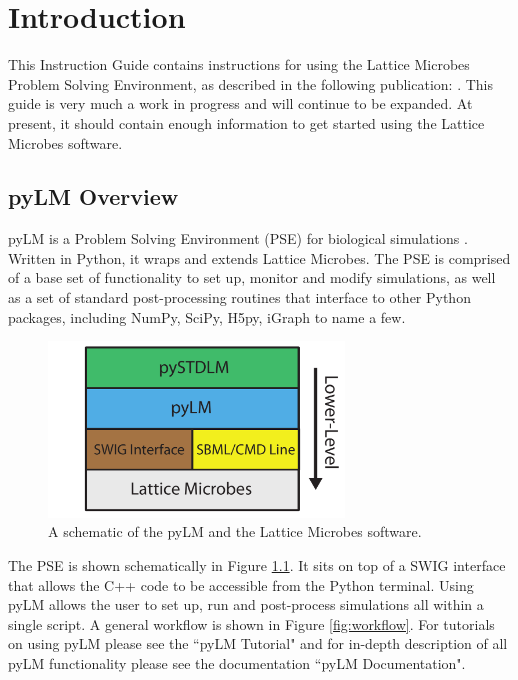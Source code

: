 \chapter{Introduction}

This Instruction Guide contains instructions for using the Lattice Microbes Problem Solving Environment, as described in the following
publication: \cite{Peterson2013}. This guide is very much a work in progress and will continue to be expanded. At present, it should contain enough information to get started using the Lattice Microbes software.


\section{pyLM Overview}
pyLM is a Problem Solving Environment (PSE) for biological simulations \cite{Peterson2013}.  Written in Python, it wraps and extends Lattice Microbes.  The PSE is comprised of a base set of functionality to set up, monitor and modify simulations, as well as a set of standard post-processing routines that interface to other Python packages, including NumPy, SciPy, H5py, iGraph to name a few.  \\

\begin{figure}[h!]
  \centering
      \includegraphics[width=0.7\textwidth]{Figures/Schematic.pdf}
  \caption{A schematic of the pyLM and the Lattice Microbes software.} \label{fig:pyschematic}
\end{figure}

The PSE is shown schematically in Figure \ref{fig:pyschematic}.  It sits on top of a SWIG interface that allows the C++ code to be accessible from the Python terminal.  Using pyLM allows the user to set up, run and post-process simulations all within a single script.  A general workflow is shown in Figure \ref{fig:workflow}.  For tutorials on using pyLM please see the ``pyLM Tutorial" and for in-depth description of all pyLM functionality please see the documentation ``pyLM Documentation".

